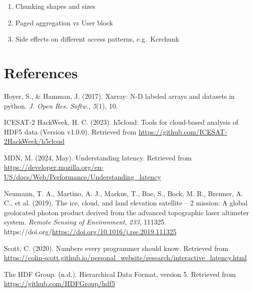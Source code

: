 \documentclass[
]{agujournal2019}
\providecommand{\tightlist}{%
  \setlength{\itemsep}{0pt}\setlength{\parskip}{0pt}}\usepackage{longtable,booktabs,array}
\newlength{\cslhangindent}
\newenvironment{CSLReferences}[2] %
 {\begin{list}{}{%
  \setlength{\itemindent}{0pt}
  \setlength{\leftmargin}{0pt}
  \setlength{\parsep}{0pt}
  \ifodd #1
   \setlength{\leftmargin}{\cslhangindent}
   \setlength{\itemindent}{-1\cslhangindent}
  \fi
  \setlength{\itemsep}{#2\baselineskip}}}
 {\end{list}}
\begin{document}
\begin{enumerate}
\def\labelenumi{\arabic{enumi}.}
\tightlist
\item
  Chunking shapes and sizes
\item
  Paged aggregation vs User block
\item
  Side effects on different access patterns, e.g.~Kerchunk
\end{enumerate}

\section{References}\label{references}

\label{refs}
\begin{CSLReferences}{1}{0}
\vspace{1em}

Hoyer, S., \& Hamman, J. (2017). Xarray: {N-D} labeled arrays and
datasets in python. \emph{J. Open Res. Softw.}, \emph{5}(1), 10.

ICESAT-2 HackWeek, H. C. (2023). h5cloud: Tools for cloud-based analysis
of HDF5 data (Version v1.0.0). Retrieved from
\url{https://github.com/ICESAT-2HackWeek/h5cloud}

MDN, M. (2024, May). Understanding latency. Retrieved from
\url{https://developer.mozilla.org/en-US/docs/Web/Performance/Understanding_latency}

Neumann, T. A., Martino, A. J., Markus, T., Bae, S., Bock, M. R.,
Brenner, A. C., et al. (2019). The ice, cloud, and land elevation
satellite -- 2 mission: A global geolocated photon product derived from
the advanced topographic laser altimeter system. \emph{Remote Sensing of
Environment}, \emph{233}, 111325.
https://doi.org/\url{https://doi.org/10.1016/j.rse.2019.111325}

Scott, C. (2020). Numbers every programmer should know. Retrieved from
\url{https://colin-scott.github.io/personal_website/research/interactive_latency.html}

The HDF Group. (n.d.). {Hierarchical Data Format, version 5}. Retrieved
from \url{https://github.com/HDFGroup/hdf5}

\end{CSLReferences}
\end{document}
